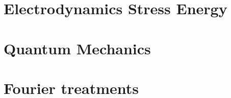 \part{Electrodynamics Stress Energy}
   
   
   
   
   
   
   
   
   
   
   

\part{Quantum Mechanics}
   
   
   
   
   
   
   
   

\part{Fourier treatments}
   
   
   
   
   
   
   
   
   

